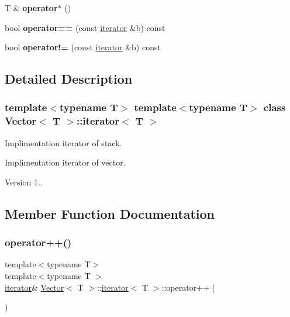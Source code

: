 \begin{DoxyCompactItemize}
T \& {\bfseries operator$\ast$} ()
\item 
\mbox{\label{classVector_1_1iterator_ad6f309683b2a0765387e048530e1c1bc}} 
bool {\bfseries operator==} (const \hyperlink{classVector_1_1iterator}{iterator} \&b) const
\item 
\mbox{\label{classVector_1_1iterator_acb5d4950c8847cf89a63551d68ec869b}} 
bool {\bfseries operator!=} (const \hyperlink{classVector_1_1iterator}{iterator} \&b) const
\end{DoxyCompactItemize}


\subsection{Detailed Description}
\subsubsection*{template$<$typename T$>$\newline
template$<$typename T$>$\newline
class Vector$<$ T $>$\+::iterator$<$ T $>$}

Implimentation iterator of stack. 

Implimentation iterator of vector.

\begin{DoxyVersion}{Version}
1.. 
\end{DoxyVersion}


\subsection{Member Function Documentation}
\mbox{\label{classVector_1_1iterator_a2e6098221d0a8b40c753819138a2d710}} 
\subsubsection{\texorpdfstring{operator++()}{operator++()}\hspace{0.1cm}{\footnotesize\ttfamily [1/4]}}
{\footnotesize\ttfamily template$<$typename T$>$ \\
template$<$typename T $>$ \\
\hyperlink{classVector_1_1iterator}{iterator}\& \hyperlink{classVector}{Vector}$<$ T $>$\+::\hyperlink{classVector_1_1iterator}{iterator}$<$ T $>$\+::operator++ (\begin{DoxyParamCaption}{ }\end{DoxyParamCaption})\hspace{0.3cm}{\ttfamily [inline]}}



